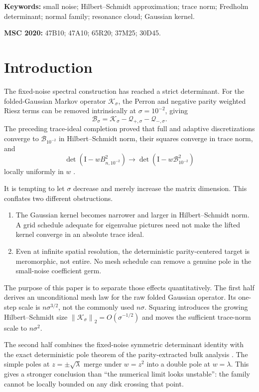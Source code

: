 \documentclass[11pt]{article}
\theoremstyle{definition}
\theoremstyle{remark}
\newcommand{\Id}{\mathrm I}
\newcommand{\cK}{\mathcal K}
\newcommand{\cB}{\mathcal B}
\newcommand{\cQ}{\mathcal Q}
\newcommand{\norm}[1]{\left\lVert #1\right\rVert}
\newcommand{\detF}{\operatorname{det}}
\begin{document}
\noindent\textbf{Keywords:} small noise; Hilbert--Schmidt approximation;
trace norm; Fredholm determinant; normal family; resonance cloud; Gaussian
kernel.

\medskip
\noindent\textbf{MSC 2020:} 47B10; 47A10; 65R20; 37M25; 30D45.

\section{Introduction}
\label{sec:introduction}

The fixed-noise spectral construction has reached a strict determinant.
For the folded-Gaussian Markov operator $\cK_\sigma$, the Perron and negative
parity weighted Riesz terms can be removed intrinsically at
$\sigma=10^{-2}$, giving
\[
 \cB_\sigma=\cK_\sigma-\cQ_{+,\sigma}-\cQ_{-,\sigma}.
\]
The preceding trace-ideal completion proved that full and adaptive
discretizations converge to $\cB_{10^{-2}}$ in Hilbert--Schmidt norm, their
squares converge in trace norm, and
\begin{equation}
 \detF(\Id-wB_{n,10^{-2}}^2)
 \longrightarrow
 \detF(\Id-w\cB_{10^{-2}}^2)
 \label{eq:fixed-noise-recalled}
\end{equation}
locally uniformly in $w$ \citep{WangTraceIdeal2026}.

It is tempting to let $\sigma$ decrease and merely increase the matrix
dimension.  This conflates two different obstructions.
\begin{enumerate}[leftmargin=2em]
 \item The Gaussian kernel becomes narrower and larger in
 Hilbert--Schmidt norm.  A grid schedule adequate for eigenvalue pictures
 need not make the lifted kernel converge in an absolute trace ideal.
 \item Even at infinite spatial resolution, the deterministic
 parity-centered target is meromorphic, not entire.  No mesh schedule can
 remove a genuine pole in the small-noise coefficient germ.
\end{enumerate}

The purpose of this paper is to separate those effects quantitatively.  The
first half derives an unconditional mesh law for the raw folded Gaussian
operator.  Its one-step scale is $n\sigma^{3/2}$, not the commonly used
$n\sigma$.  Squaring introduces the growing Hilbert--Schmidt size
$\norm{\cK_\sigma}_2=O(\sigma^{-1/2})$ and moves the sufficient trace-norm
scale to $n\sigma^2$.

The second half combines the fixed-noise symmetric determinant identity
with the exact deterministic pole theorem of the parity-extracted bulk
analysis \citep{WangBulkScattering2026}.  The simple poles at
$z=\pm\sqrt\lambda$ merge under $w=z^2$ into a double pole at
$w=\lambda$.  This gives a stronger conclusion than ``the numerical limit
looks unstable'': the family cannot be locally bounded on any disk crossing
that point.
\end{document}

